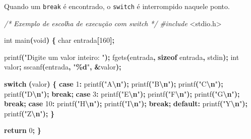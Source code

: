 \documentclass[
  11pt,
  a4paper,
]{scrbook}
\newenvironment{Shaded}{\begin{snugshade}}{\end{snugshade}}
\newcommand{\CommentTok}[1]{\textcolor[rgb]{0.56,0.35,0.01}{\textit{#1}}}
\newcommand{\ControlFlowTok}[1]{\textcolor[rgb]{0.13,0.29,0.53}{\textbf{#1}}}
\newcommand{\DataTypeTok}[1]{\textcolor[rgb]{0.13,0.29,0.53}{#1}}
\newcommand{\DecValTok}[1]{\textcolor[rgb]{0.00,0.00,0.81}{#1}}
\newcommand{\ImportTok}[1]{#1}
\newcommand{\KeywordTok}[1]{\textcolor[rgb]{0.13,0.29,0.53}{\textbf{#1}}}
\newcommand{\NormalTok}[1]{#1}
\newcommand{\OperatorTok}[1]{\textcolor[rgb]{0.81,0.36,0.00}{\textbf{#1}}}
\newcommand{\PreprocessorTok}[1]{\textcolor[rgb]{0.56,0.35,0.01}{\textit{#1}}}
\newcommand{\SpecialCharTok}[1]{\textcolor[rgb]{0.81,0.36,0.00}{\textbf{#1}}}
\newcommand{\StringTok}[1]{\textcolor[rgb]{0.31,0.60,0.02}{#1}}
\begin{document}
Quando um \texttt{break} é encontrado, o \texttt{switch} é interrompido
naquele ponto.

\begin{Shaded}
\begin{Highlighting}[]
\CommentTok{/*}
\CommentTok{Exemplo de escolha de execução com switch}
\CommentTok{*/}
\PreprocessorTok{\#include }\ImportTok{\textless{}stdio.h\textgreater{}}

\DataTypeTok{int}\NormalTok{ main}\OperatorTok{(}\DataTypeTok{void}\OperatorTok{)} \OperatorTok{\{}
    \DataTypeTok{char}\NormalTok{ entrada}\OperatorTok{[}\DecValTok{160}\OperatorTok{];}

\NormalTok{    printf}\OperatorTok{(}\StringTok{"Digite um valor inteiro: "}\OperatorTok{);}
\NormalTok{    fgets}\OperatorTok{(}\NormalTok{entrada}\OperatorTok{,} \KeywordTok{sizeof}\NormalTok{ entrada}\OperatorTok{,}\NormalTok{ stdin}\OperatorTok{);}
    \DataTypeTok{int}\NormalTok{ valor}\OperatorTok{;}
\NormalTok{    sscanf}\OperatorTok{(}\NormalTok{entrada}\OperatorTok{,} \StringTok{"}\SpecialCharTok{\%d}\StringTok{"}\OperatorTok{,} \OperatorTok{\&}\NormalTok{valor}\OperatorTok{);}

    \ControlFlowTok{switch} \OperatorTok{(}\NormalTok{valor}\OperatorTok{)} \OperatorTok{\{}
        \ControlFlowTok{case} \DecValTok{1}\OperatorTok{:}
\NormalTok{            printf}\OperatorTok{(}\StringTok{"A}\SpecialCharTok{\textbackslash{}n}\StringTok{"}\OperatorTok{);}
\NormalTok{            printf}\OperatorTok{(}\StringTok{"B}\SpecialCharTok{\textbackslash{}n}\StringTok{"}\OperatorTok{);}
\NormalTok{            printf}\OperatorTok{(}\StringTok{"C}\SpecialCharTok{\textbackslash{}n}\StringTok{"}\OperatorTok{);}
\NormalTok{            printf}\OperatorTok{(}\StringTok{"D}\SpecialCharTok{\textbackslash{}n}\StringTok{"}\OperatorTok{);}
            \ControlFlowTok{break}\OperatorTok{;}
        \ControlFlowTok{case} \DecValTok{3}\OperatorTok{:}
\NormalTok{            printf}\OperatorTok{(}\StringTok{"E}\SpecialCharTok{\textbackslash{}n}\StringTok{"}\OperatorTok{);}
\NormalTok{            printf}\OperatorTok{(}\StringTok{"F}\SpecialCharTok{\textbackslash{}n}\StringTok{"}\OperatorTok{);}
\NormalTok{            printf}\OperatorTok{(}\StringTok{"G}\SpecialCharTok{\textbackslash{}n}\StringTok{"}\OperatorTok{);}
            \ControlFlowTok{break}\OperatorTok{;}
        \ControlFlowTok{case} \DecValTok{10}\OperatorTok{:}
\NormalTok{            printf}\OperatorTok{(}\StringTok{"H}\SpecialCharTok{\textbackslash{}n}\StringTok{"}\OperatorTok{);}
\NormalTok{            printf}\OperatorTok{(}\StringTok{"I}\SpecialCharTok{\textbackslash{}n}\StringTok{"}\OperatorTok{);}
            \ControlFlowTok{break}\OperatorTok{;}
        \ControlFlowTok{default}\OperatorTok{:}
\NormalTok{            printf}\OperatorTok{(}\StringTok{"Y}\SpecialCharTok{\textbackslash{}n}\StringTok{"}\OperatorTok{);}
\NormalTok{            printf}\OperatorTok{(}\StringTok{"Z}\SpecialCharTok{\textbackslash{}n}\StringTok{"}\OperatorTok{);}
    \OperatorTok{\}}

    \ControlFlowTok{return} \DecValTok{0}\OperatorTok{;}
\OperatorTok{\}}
\end{Highlighting}
\end{Shaded}
\end{document}
